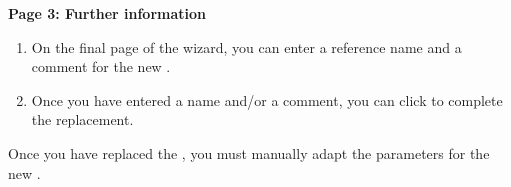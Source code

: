 
\textbf{Page 3: Further information}
\begin{enumerate}
\item On the final page of the wizard, you can enter a \gdcase{} reference name and a comment for the new \gdcase{}. 
\item Once you have entered a name and/or a comment, you can click  to complete the replacement.
\end{enumerate}


Once you have replaced the \gdcase{}, you must manually adapt the parameters for the new \gdcase{}.

